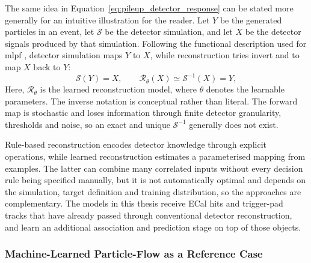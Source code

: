 The same idea in Equation~\ref{eq:pileup_detector_response} can be stated more generally for an intuitive illustration for the reader. Let \(Y\) be the generated
particles in an event, let \(\mathcal{S}\) be the detector simulation, and let
\(X\) be the detector signals produced by that simulation. Following the
functional description used for \gls{mlpf} \cite{pata2021-mlpf}, detector simulation
maps \(Y\) to \(X\), while reconstruction tries invert and to map \(X\) back to \(Y\):
\begin{equation}
    \mathcal{S}(Y)=X,
    \qquad
    \mathcal{R}_{\theta}(X)
    \simeq
    \mathcal{S}^{-1}(X)=Y,
    \label{eq:learned_reconstruction_mapping}
\end{equation}
Here, \(\mathcal{R}_{\theta}\) is the learned reconstruction model, where $\theta$ denotes the learnable parameters. The
inverse notation is conceptual rather than literal.
The forward map is stochastic and loses information through finite detector
granularity, thresholds and noise, so an exact and unique
\(\mathcal{S}^{-1}\) generally does not exist. 

Rule-based reconstruction encodes detector knowledge through explicit
operations, while learned reconstruction estimates a parameterised mapping
from examples. The latter can combine many correlated inputs without every
decision rule being specified manually, but it is not automatically optimal
and depends on the simulation, target definition and training distribution, so
the approaches are complementary. The models in this thesis receive
ECal hits and trigger-pad tracks that have already passed through conventional
detector reconstruction, and learn an additional association and prediction
stage on top of those objects.


\subsubsection{Machine-Learned Particle-Flow as a Reference Case}

